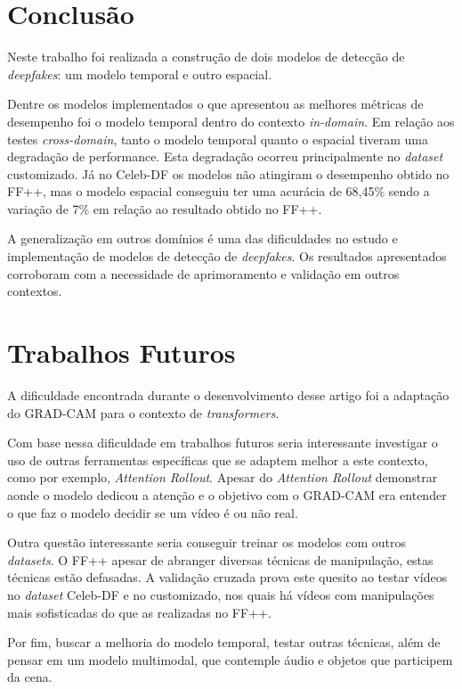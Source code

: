 \documentclass[12pt]{article}
\begin{document}
\section{Conclusão}
Neste trabalho foi realizada a construção de dois modelos de detecção de \textit{deepfakes}:
um modelo temporal e outro espacial.

Dentre os modelos implementados o que apresentou as melhores métricas de desempenho foi o modelo
temporal dentro do contexto \textit{in-domain}. Em relação aos testes \textit{cross-domain},
tanto o modelo temporal quanto o espacial tiveram uma degradação de performance.
Esta degradação ocorreu principalmente no \textit{dataset} customizado. Já no Celeb-DF os modelos
não atingiram o desempenho obtido no FF++, mas o modelo espacial conseguiu ter uma acurácia de 68,45\%
sendo a variação de 7\% em relação ao resultado obtido no FF++.

A generalização em outros domínios é uma das dificuldades no estudo e implementação de
modelos de detecção de \textit{deepfakes}.
Os resultados apresentados corroboram com a 
necessidade de aprimoramento e validação em outros contextos.


\section{Trabalhos Futuros}
A dificuldade encontrada durante o desenvolvimento desse
artigo foi a adaptação do GRAD-CAM para o contexto de \textit{transformers}.

Com base nessa dificuldade em trabalhos futuros seria interessante investigar
o uso de outras ferramentas específicas que se adaptem melhor a este contexto,
como por exemplo, \textit{Attention Rollout}. 
Apesar do \textit{Attention Rollout} demonstrar
aonde o modelo dedicou a atenção e o objetivo com o GRAD-CAM era entender
o que faz o modelo decidir se um vídeo é ou não real.

Outra questão interessante seria conseguir treinar os modelos
com outros \textit{datasets}. O FF++ apesar de abranger diversas técnicas de manipulação,
estas técnicas estão defasadas. A validação cruzada prova este quesito
ao testar vídeos no \textit{dataset} Celeb-DF e no customizado, nos quais
há vídeos com manipulações mais sofisticadas do que as realizadas no FF++.

Por fim, buscar a melhoria do modelo temporal, testar outras técnicas, além
de pensar em um modelo multimodal, que contemple áudio e objetos
que participem da cena.

\printbibliography
\end{document}
